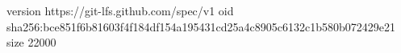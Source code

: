 version https://git-lfs.github.com/spec/v1
oid sha256:bce851f6b81603f4f184df154a195431cd25a4c8905c6132c1b580b072429e21
size 22000
